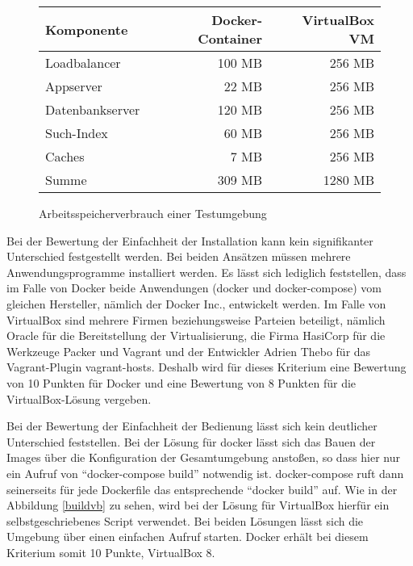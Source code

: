 \begin{figure}[!ht]
  \begin{center}
    \resizebox{15cm}{!} {
      \begin{tabular}{|l|r|r|}
      \hline
      Komponente & Docker-Container & VirtualBox VM \\
      \hline
      Loadbalancer & 100 MB & 256 MB \\
      \hline
      Appserver & 22 MB & 256 MB \\
      \hline
      Datenbankserver & 120 MB & 256 MB \\
      \hline
      Such-Index & 60 MB & 256 MB \\
      \hline
      Caches & 7 MB & 256 MB \\
      \hline
      Summe & 309 MB & 1280 MB \\
      \hline
      \end{tabular}
    }
    \caption{Arbeitsspeicherverbrauch einer Testumgebung}
    \label{memory}
  \end{center}
\end{figure}

Bei der Bewertung der Einfachheit der Installation kann kein signifikanter Unterschied festgestellt werden. Bei beiden Ansätzen müssen mehrere Anwendungsprogramme installiert werden. Es lässt sich lediglich feststellen, dass im Falle von Docker beide Anwendungen (docker und docker-compose) vom gleichen Hersteller, nämlich der Docker Inc., entwickelt werden. Im Falle von VirtualBox sind mehrere Firmen beziehungsweise Parteien beteiligt, nämlich Oracle für die Bereitstellung der Virtualisierung, die Firma HasiCorp für die Werkzeuge Packer und Vagrant und der Entwickler Adrien Thebo für das Vagrant-Plugin vagrant-hosts. Deshalb wird für dieses Kriterium eine Bewertung von 10 Punkten für Docker und eine Bewertung von 8 Punkten für die VirtualBox-Lösung vergeben.

Bei der Bewertung der Einfachheit der Bedienung lässt sich kein deutlicher Unterschied feststellen. Bei der Lösung für docker lässt sich das Bauen der Images über die Konfiguration der Gesamtumgebung anstoßen, so dass hier nur ein Aufruf von "`docker-compose build"' notwendig ist. docker-compose ruft dann seinerseits für jede Dockerfile das entsprechende "`docker build"' auf. Wie in der Abbildung \ref{buildvb} zu sehen, wird bei der Lösung für VirtualBox hierfür ein selbstgeschriebenes Script verwendet. Bei beiden Lösungen lässt sich die Umgebung über einen einfachen Aufruf starten. Docker erhält bei diesem Kriterium somit 10 Punkte, VirtualBox 8.

